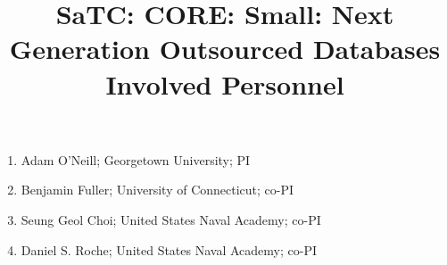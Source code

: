 \documentclass[11pt]{article}
\begin{document}
\title{SaTC: CORE: Small: Next Generation Outsourced Databases Involved Personnel}

\maketitle

\begin{enumerate}
\item Adam O'Neill; Georgetown University; PI
\item Benjamin Fuller; University of Connecticut; co-PI
\item Seung Geol Choi; United States Naval Academy; co-PI
\item Daniel S. Roche; United States Naval Academy; co-PI
\end{enumerate}
\end{document}
